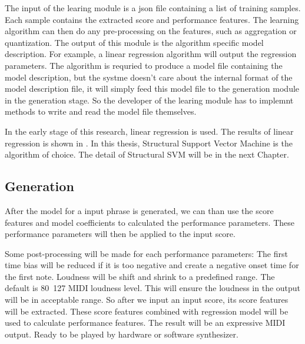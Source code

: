    The input of the learing module is a json file containing a list of training samples. Each sample contains the extracted score and performance features. The learning algorithm can then do any pre-processing on the features, such as aggregation or quantization. The output of this module is the algorithm specific model description. For example, a linear regression algorithm will output the regression parameters. The algorithm is requried to produce a model file containing the model description, but the systme doesn't care about the internal format of the model description file, it will simply feed this model file to the generation module in the generation stage. So the developer of the learing module has to implemnt methods to write and read the model file themselves.

   In the early stage of this research, linear regression is used. The results of linear regression is shown in \cite{TODO:wocmat}. In this thesis, Structural Support Vector Machine\cite{TODO:svm-hmm} is the algorithm of choice. The detail of Structural SVM will be in the next Chapter.
   \subsection{Generation}
      After the model for a input phrase is generated, we can than use the score features and model coefficients to calculated the performance parameters. These performance parameters will then be applied to the input score.
      
      Some post-processing will be made for each performance parameters: The first time bias will be reduced if it is too negative and create a negative onset time for the first note. Loudness will be shift and shrink to a predefined range. The default is 80~127 MIDI loudness level. This will ensure the loudness in the output will be in acceptable range. 
 So after we input an input score, its score features will be extracted. These score features combined with regression model will be used to calculate performance features. The result will be an expressive MIDI output. Ready to be played by hardware or software synthesizer.  
   
